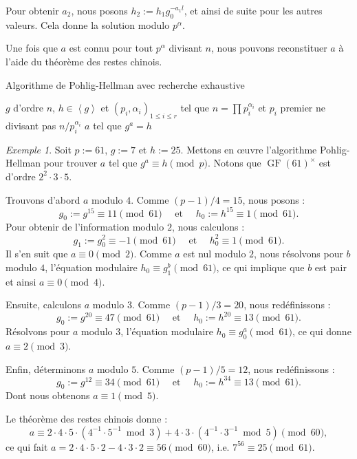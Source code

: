 \documentclass[a4paper, titlepage]{article}
\theoremstyle{definition}
\theoremstyle{remark}
\newtheorem{exem}[theo]{Exemple}
\def\gf{\operatorname{GF}}
\def\gen #1{\left\langle#1\right\rangle}
\begin{document}
Pour obtenir $a_2$, nous posons $h_2 := h_1g_0^{-a_1l}$, et ainsi de suite pour les autres valeurs. Cela donne la solution modulo $p^\alpha$.

Une fois que $a$ est connu pour tout $p^\alpha$ divisant $n$, nous pouvons reconstituer $a$ à l'aide du théorème des restes chinois.

\begin{algorithm}[h]
\caption{Algorithme de Pohlig-Hellman avec recherche exhaustive}
\label{algoPohligHellman}
\begin{algorithmic}[1]
\REQUIRE $g$ d'ordre $n$, $h \in \gen{g}$ et ${(p_i,\alpha_i)}_{1\leqslant i \leqslant r}$ tel que $n = \prod p_i^{\alpha_i}$ et $p_i$ premier ne divisant pas $n/p_i^{\alpha_i}$
\ENSURE $a$ tel que $g^a = h$
			\ENDWHILE
		\ENDIF
	\ENDFOR
\ENDFOR
{}
\end{algorithmic}
\end{algorithm}

\begin{exem}
Soit $p := 61$, $g := 7$ et $h := 25$. Mettons en \oe uvre l'algorithme Pohlig-Hellman pour trouver $a$ tel que $ g^a \equiv h \pmod{p}$. Notons que $\gf(61)^\times$ est d'ordre $2^2\cdot3\cdot5$. 

Trouvons d'abord $a$ modulo $4$. Comme $(p-1)/4 = 15$, nous posons :
$$g_0 := g^{15} \equiv 11 \pmod{61} \quad\text{ et }\quad h_0 := h^{15} \equiv 1 \pmod{61}.$$
Pour obtenir de l'information modulo $2$, nous calculons :
$$g_1 := g_0^{2} \equiv -1 \pmod{61} \quad\text{ et }\quad h_0^2 \equiv 1 \pmod{61}.$$
Il s'en suit que $a \equiv 0 \pmod{2}$. Comme $a$ est nul modulo $2$, nous résolvons pour $b$ modulo $4$, l'équation modulaire $h_0 \equiv g_1^b \pmod{61}$, ce qui implique que $b$ est pair et ainsi $a \equiv 0 \pmod{4}$.

Ensuite, calculons $a$ modulo $3$. Comme $(p-1)/3 = 20$, nous redéfinissons :
$$g_0 := g^{20} \equiv 47 \pmod{61} \quad\text{ et }\quad h_0 := h^{20} \equiv 13 \pmod{61}.$$
Résolvons pour $a$ modulo $3$, l'équation modulaire $h_0 \equiv g_0^a \pmod{61}$, ce qui donne $a \equiv 2 \pmod{3}.$

Enfin, déterminons $a$ modulo $5$. Comme $(p-1)/5 = 12$, nous redéfinissons :
$$g_0 := g^{12} \equiv 34 \pmod{61} \quad\text{ et }\quad h_0 := h^{34} \equiv 13 \pmod{61}.$$
Dont nous obtenons $a \equiv 1 \pmod{5}.$

Le théorème des restes chinois donne :
$$a\equiv 2\cdot4\cdot5\cdot(4^{-1}\cdot5^{-1} \bmod{3}) + 4\cdot3\cdot(4^{-1}\cdot3^{-1} \bmod{5}) \pmod{60},$$
ce qui fait $a = 2\cdot4\cdot5\cdot2 - 4\cdot3\cdot2 \equiv 56 \pmod{60}$, i.e. $7^{56} \equiv 25 \pmod{61}$.
\end{exem}
\end{document}
